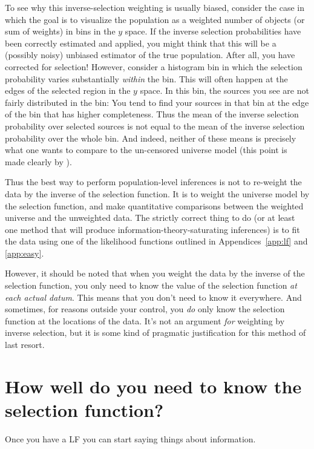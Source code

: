 \documentclass[modern]{aastex62}
\newcommand{\appendixnames}{Appendices}
\begin{document}
To see why this inverse-selection weighting is usually biased,
consider the case in which the goal is to visualize the population as
a weighted number of objects (or sum of weights) in bins in the $y$
space.
If the inverse selection probabilities have been correctly estimated
and applied, you might think that this will be a (possibly noisy)
unbiased estimator of the true population.
After all, you have corrected for selection!
However, consider a histogram bin in which the selection probability
varies substantially \emph{within} the bin.
This will often happen at the edges of the selected region in the $y$
space.
In this bin, the sources you see are not fairly distributed in the
bin: You tend to find your sources in that bin at the edge of the bin
that has higher completeness.
Thus the mean of the inverse selection probability over selected
sources is not equal to the mean of the inverse selection probability
over the whole bin.
And indeed, neither of these means is precisely what one wants to
compare to the un-censored universe model (this point is made clearly
by \citealt{blogpost}).

Thus the best way to perform population-level inferences is not to
re-weight the data by the inverse of the selection function.  It is to
weight the universe model by the selection function, and make
quantitative comparisons between the weighted universe and the
unweighted data.
The strictly correct thing to do (or at least one method that will
produce information-theory-saturating inferences) is to fit the data
using one of the likelihood functions outlined in 
\appendixnames~\ref{app:lf} and \ref{app:easy}.

However, it should be noted that when you weight the data by the
inverse of the selection function, you only need to know the value of
the selection function \emph{at each actual datum}.
This means that you don't need to know it everywhere.
And sometimes, for reasons outside your control, you \emph{do} only
know the selection function at the locations of the data.
It's not an argument \emph{for} weighting by inverse selection, but it
is some kind of pragmatic justification for this method of last
resort.

\section{How well do you need to know the selection function?}\label{sec:quality}

Once you have a LF you can start saying things about information.
\end{document}
